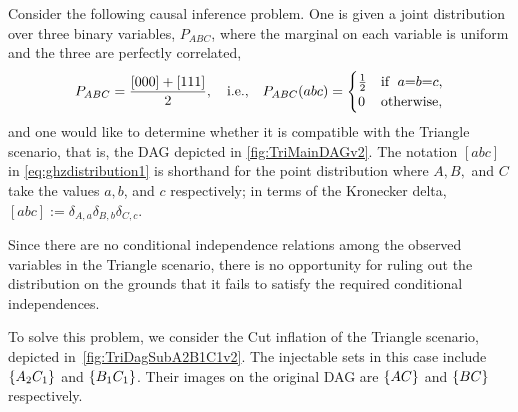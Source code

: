 Consider the following causal inference problem.  One is given a joint distribution over three binary variables, $P_{A B C}$, where the marginal on each variable is uniform and the three are perfectly correlated,
\begin{align}\label{eq:ghzdistribution1}
P_{A B C} =\frac{[000]+[111]}{2},\quad\text{i.e.,}\quad P_{A B C}(a b c)=\begin{cases}\tfrac{1}{2}&\text{if }\; a\mathord{=} b\mathord{=} c, \\ 0&\text{otherwise},\end{cases}
\end{align}
and one would like to determine whether it is compatible with the Triangle scenario, that is, the DAG depicted in \cref{fig:TriMainDAGv2}. The notation $ [abc]$ in \cref{eq:ghzdistribution1} is shorthand for the point distribution where $A, B,$ and $C$ take the values $a, b$, and $c$ respectively; in terms of the Kronecker delta, $[abc]:= \delta_{A,a} \delta_{B,b} \delta_{C,c}$.

Since there are no conditional independence relations among the observed variables in the Triangle scenario, there is no opportunity for ruling out the distribution on the grounds that it fails to satisfy the required conditional independences. 


To solve this problem, we consider the Cut inflation of the Triangle scenario, depicted in~\cref{fig:TriDagSubA2B1C1v2}.  
The injectable sets in this case include $\left\lbrace A_2 C_1\right\rbrace$ and $\left\lbrace B_1 C_1\right\rbrace$.  Their images on the original DAG are $\left\lbrace AC\right\rbrace$ and $\left\lbrace BC\right\rbrace$ respectively.

